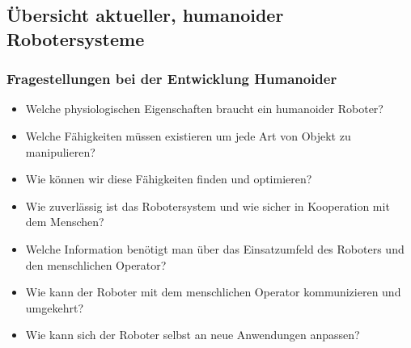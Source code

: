 \subsection{Übersicht aktueller, humanoider Robotersysteme}

\subsubsection{Fragestellungen bei der Entwicklung Humanoider}
\begin{itemize}
	\item Welche physiologischen Eigenschaften braucht ein humanoider Roboter?
	\item Welche Fähigkeiten müssen existieren um jede Art von Objekt zu manipulieren?
	\item Wie können wir diese Fähigkeiten finden und optimieren?
	\item Wie zuverlässig ist das Robotersystem und wie sicher in Kooperation mit dem Menschen?
	\item Welche Information benötigt man über das Einsatzumfeld des Roboters und den menschlichen Operator?
	\item Wie kann der Roboter mit dem menschlichen Operator kommunizieren und umgekehrt?
	\item Wie kann sich der Roboter selbst an neue Anwendungen anpassen?
\end{itemize}

